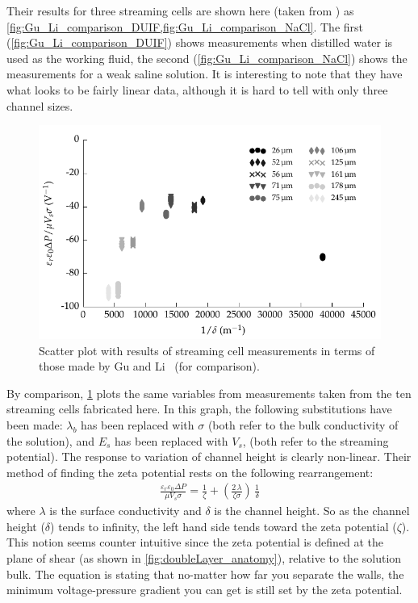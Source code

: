   Their results for three streaming cells are shown here (taken from \cite{Gu2000}) as \cref{fig:Gu_Li_comparison_DUIF,fig:Gu_Li_comparison_NaCl}.
  The first (\cref{fig:Gu_Li_comparison_DUIF}) shows measurements when distilled water is used as the working fluid, the second (\cref{fig:Gu_Li_comparison_NaCl}) shows the measurements for a weak saline solution.
  It is interesting to note that they have what looks to be fairly linear data, although it is hard to tell with only three channel sizes.

  \begin{figure}
      \centering
      \includegraphics{content/pt1/01-PowerHarvesting/graphics/graph_streamingComparison_gu}
      \caption{\label{fig:streamingCell_scatter_Gu_Li}Scatter plot with results of streaming cell measurements in terms of those made by Gu and Li~\cite{Gu2000} (for comparison).}
  \end{figure}

  By comparison, \cref{fig:streamingCell_scatter_Gu_Li} plots the same variables from measurements taken from the ten streaming cells fabricated here.
  In this graph, the following substitutions have been made: $\lambda_{b}$ has been replaced with $\sigma$ (both refer to the bulk conductivity of the solution), and $E_{s}$ has been replaced with $V_{s}$, (both refer to the streaming potential).
  The response to variation of channel height is clearly non-linear.
  Their method of finding the zeta potential rests on the following rearrangement:
  \begin{eqnarray}
      \frac{\varepsilon_{r}\varepsilon_{0}\Delta P}{\mu V_{s}\sigma} = \frac{1}{\zeta} + \left( \frac{2\,\lambda}{\zeta \sigma}\right)\,\frac{1}{\delta}
  \end{eqnarray}
  where $\lambda$ is the surface conductivity and $\delta$ is the channel height.
  So as the channel height ($\delta$) tends to infinity, the left hand side tends toward the zeta potential ($\zeta$).
  This notion seems counter intuitive since the zeta potential is defined at the plane of shear (as shown in \cref{fig:doubleLayer_anatomy}), relative to the solution bulk.
  The equation is stating that no-matter how far you separate the walls, the minimum voltage-pressure gradient you can get is still set by the zeta potential.

